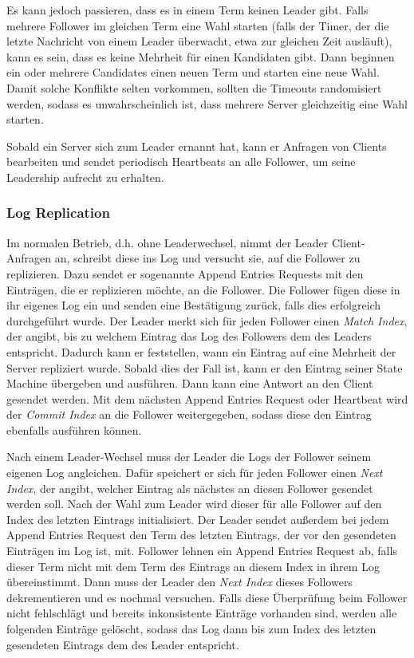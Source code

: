 Es kann jedoch passieren, dass es in einem Term keinen Leader gibt. Falls mehrere Follower im gleichen Term eine Wahl starten (falls der Timer, der die letzte Nachricht von einem Leader überwacht, etwa zur gleichen Zeit ausläuft), kann es sein, dass es keine Mehrheit für einen Kandidaten gibt. Dann beginnen ein oder mehrere Candidates einen neuen Term und starten eine neue Wahl. Damit solche Konflikte selten vorkommen, sollten die Timeouts randomisiert werden, sodass es unwahrscheinlich ist, dass mehrere Server gleichzeitig eine Wahl starten.

Sobald ein Server sich zum Leader ernannt hat, kann er Anfragen von Clients bearbeiten und sendet periodisch Heartbeats an alle Follower, um seine Leadership aufrecht zu erhalten.

\subsubsection{Log Replication}

Im normalen Betrieb, d.h. ohne Leaderwechsel, nimmt der Leader Client-Anfragen an, schreibt diese ins Log und versucht sie, auf die Follower zu replizieren. Dazu sendet er sogenannte Append Entries Requests mit den Einträgen, die er replizieren möchte, an die Follower. Die Follower fügen diese in ihr eigenes Log ein und senden eine Bestätigung zurück, falls dies erfolgreich durchgeführt wurde. Der Leader merkt sich für jeden Follower einen \textit{Match Index}, der angibt, bis zu welchem Eintrag das Log des Followers dem des Leaders entspricht. Dadurch kann er feststellen, wann ein Eintrag auf eine Mehrheit der Server repliziert wurde. Sobald dies der Fall ist, kann er den Eintrag seiner State Machine übergeben und ausführen. Dann kann eine Antwort an den Client gesendet werden. Mit dem nächsten Append Entries Request oder Heartbeat wird der \textit{Commit Index} an die Follower weitergegeben, sodass diese den Eintrag ebenfalls ausführen können.

Nach einem Leader-Wechsel muss der Leader die Logs der Follower seinem eigenen Log angleichen. Dafür speichert er sich für jeden Follower einen \textit{Next Index}, der angibt, welcher Eintrag als nächstes an diesen Follower gesendet werden soll. Nach der Wahl zum Leader wird dieser für alle Follower auf den Index des letzten Eintrags initialisiert. Der Leader sendet außerdem bei jedem Append Entries Request den Term des letzten Eintrags, der vor den gesendeten Einträgen im Log ist, mit. Follower lehnen ein Append Entries Request ab, falls dieser Term nicht mit dem Term des Eintrags an diesem Index in ihrem Log übereinstimmt. Dann muss der Leader den \textit{Next Index} dieses Followers dekrementieren und es nochmal versuchen. Falls diese Überprüfung beim Follower nicht fehlschlägt und bereits inkonsistente Einträge vorhanden sind, werden alle folgenden Einträge gelöscht, sodass das Log dann bis zum Index des letzten gesendeten Eintrags dem des Leader entspricht.

